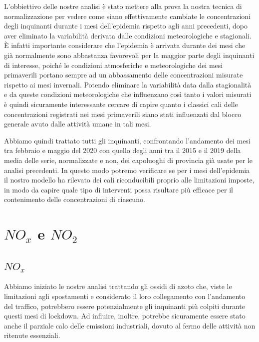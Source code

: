 L'obbiettivo delle nostre analisi è stato mettere alla prova la nostra tecnica di normalizzazione per vedere come siano effettivamente cambiate le concentrazioni degli inquinanti durante i mesi dell'epidemia rispetto agli anni precedenti, dopo aver eliminato la variabilità derivata dalle condizioni meteorologiche e stagionali. È infatti importante considerare che l'epidemia è arrivata durante dei mesi che già normalmente sono abbastanza favorevoli per la maggior parte degli inquinanti di interesse, poiché le condizioni atmosferiche e meteorologiche dei mesi primaverili portano sempre ad un abbassamento delle concentrazioni misurate rispetto ai mesi invernali.
Potendo eliminare la variabilità data dalla stagionalità e da queste condizioni meteorologiche che influenzano così tanto i valori misurati è quindi sicuramente interessante cercare di capire quanto i classici cali delle concentrazioni registrati nei mesi primaverili siano stati influenzati dal blocco generale avuto dalle attività umane in tali mesi.

Abbiamo quindi trattato tutti gli inquinanti, confrontando l'andamento dei mesi tra febbraio e maggio del 2020 con quello degli anni tra il 2015 e il 2019 della media delle serie, normalizzate e non, dei capoluoghi di provincia già usate per le analisi precedenti. In questo modo potremo verificare se per i mesi dell'epidemia il nostro modello ha rilevato dei cali riconducibili proprio alle limitazioni imposte, in modo da capire quale tipo di interventi possa risultare più efficace
 per il contenimento delle concentrazioni di ciascuno.

\section{$NO_x$ e $NO_2$}
\subsection{$NO_x$}
Abbiamo iniziato le nostre analisi trattando gli ossidi di azoto che, viste le limitazioni agli spostamenti e considerato il loro collegamento con l'andamento del traffico, potrebbero essere potenzialmente gli inquinanti più colpiti durante questi mesi di lockdown. Ad influire, inoltre, potrebbe sicuramente essere stato anche il parziale calo delle emissioni industriali, dovuto al fermo delle attività non ritenute essenziali.

